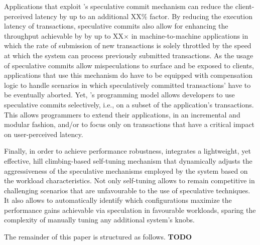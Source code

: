 Applications that exploit \specula's speculative commit mechanism can reduce the client-perceived latency by up to an additional XX\% factor. By reducing the execution latency of transactions,  speculative commits also allow for enhancing the throughput achievable by \specula by up to XX$\times$ in machine-to-machine applications in which the rate of submission of new transactions is solely throttled by the speed at which the system can process previously submitted transactions. As the usage of speculative commits allow mispeculations to surface and be exposed to clients, applications that use this mechanism do have to be equipped with compensation logic to handle scenarios in which speculatively committed transactions' have to be eventually aborted.  Yet, \specula's programming model allows developers to use speculative commits selectively, i.e., on a subset of the application's transactions. This allows programmers to extend their applications, in an incremental and modular fashion, and/or to focus only on  transactions that have a critical impact on user-perceived latency.

Finally, in order to achieve performance robustness, \specula integrates a lightweight, yet effective, hill climbing-based self-tuning  mechanism that dynamically adjusts the aggressiveness of the speculative mechanisms employed by the system based on the workload characteristics. Not only self-tuning allows \specula to remain competitive in challenging scenarios that are unfavourable to the use of speculative techniques. It also allows to automatically identify which configurations maximize the performance gains achievable via speculation in favourable workloads, sparing the complexity of manually tuning any additional system's knobs.

The remainder of this paper is structured as follows. {\bf TODO}


